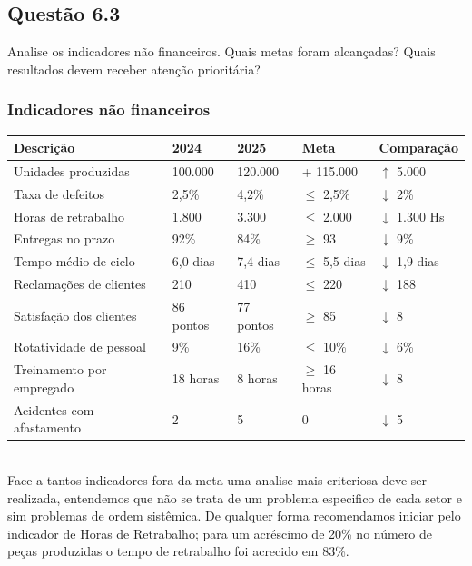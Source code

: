 \subsection{Questão 6.3}
Analise os indicadores não financeiros. Quais metas foram alcançadas? Quais resultados devem receber atenção prioritária?\\
\subsubsection{Indicadores não financeiros}
\hspace*{-2cm}                                                                 
 \begin{tabular}{p{4cm} l  l l l}                                                     
 \toprule                                                                       
   \textbf{Descrição} & \textbf{2024} & \textbf{2025} &  \textbf{Meta} & \textbf{Comparação}  \\
 \midrule
  Unidades produzidas & 100.000 & 120.000 & + 115.000 & $\uparrow$ 5.000 \\  
 \midrule
  Taxa de defeitos & 2,5\% & 4,2\% & $\leq$ 2,5\%  &  $\downarrow$ 2\% \\
 \midrule                                                                       
   Horas de retrabalho & 1.800 & 3.300 & $\leq$ 2.000 & $\downarrow$ 1.300 Hs \\
 \midrule                                                                       
   Entregas no prazo & 92\% & 84\% & $\geq$ 93 & $\downarrow$ 9\% \\
 \midrule                                                                       
   Tempo médio de ciclo & 6,0 dias & 7,4 dias & $\leq$ 5,5 dias & $\downarrow$ 1,9 dias \\
  \midrule
   Reclamações de clientes & 210 & 410 & $\leq$ 220 & $\downarrow$ 188 \\
  \midrule
   Satisfação dos clientes & 86 pontos & 77 pontos& $\geq$ 85 & $\downarrow$ 8 \\
  \midrule
   Rotatividade de pessoal & 9\% & 16\%& $\leq$ 10\% & $\downarrow$ 6\% \\
  \midrule
   Treinamento por empregado & 18 horas & 8 horas &  $\geq$ 16 horas & $\downarrow$ 8  \\
  \midrule
   Acidentes com afastamento & 2 & 5 & 0 & $\downarrow$ 5 \\
 \bottomrule                                                                    
 \end{tabular}\\
 Face a tantos indicadores fora da meta uma analise mais criteriosa deve ser realizada, entendemos que não se trata de um problema especifico de cada setor e sim problemas de ordem sistêmica. De qualquer forma recomendamos iniciar pelo indicador de Horas de Retrabalho; para um acréscimo de 20\% no número de peças produzidas o tempo de retrabalho foi acrecido em 83\%.
